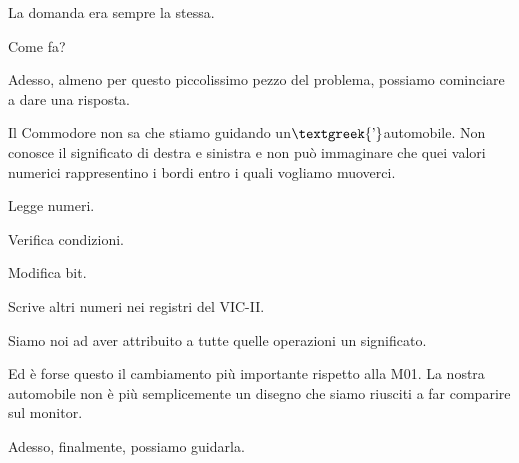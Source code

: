 \documentclass{article}
\begin{document}
La domanda era sempre la stessa.

Come fa?

Adesso, almeno per questo piccolissimo pezzo del problema, possiamo cominciare a dare una risposta.

Il Commodore non sa che stiamo guidando un$\text{\textgreek{’}}$automobile. Non conosce il significato di destra e
sinistra e non può immaginare che quei valori numerici rappresentino i bordi entro i quali vogliamo muoverci.

Legge numeri.

Verifica condizioni.

Modifica bit.

Scrive altri numeri nei registri del VIC-II.

Siamo noi ad aver attribuito a tutte quelle operazioni un significato.

Ed è forse questo il cambiamento più importante rispetto alla M01. La nostra automobile non è più semplicemente un
disegno che siamo riusciti a far comparire sul monitor.

Adesso, finalmente, possiamo guidarla.


\bigskip
\end{document}
